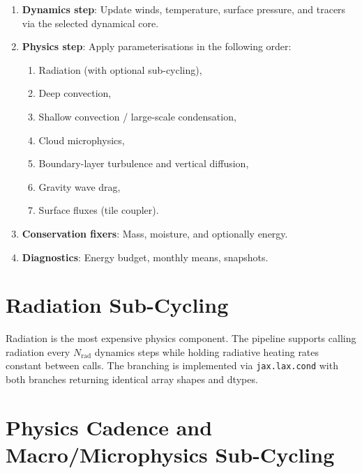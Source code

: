 \documentclass[11pt,twoside]{report}
\begin{document}
\begin{enumerate}[nosep]
  \item \textbf{Dynamics step}: Update winds, temperature, surface pressure,
    and tracers via the selected dynamical core.
  \item \textbf{Physics step}: Apply parameterisations in the following order:
    \begin{enumerate}[nosep]
      \item Radiation (with optional sub-cycling),
      \item Deep convection,
      \item Shallow convection / large-scale condensation,
      \item Cloud microphysics,
      \item Boundary-layer turbulence and vertical diffusion,
      \item Gravity wave drag,
      \item Surface fluxes (tile coupler).
    \end{enumerate}
  \item \textbf{Conservation fixers}: Mass, moisture, and optionally energy.
  \item \textbf{Diagnostics}: Energy budget, monthly means, snapshots.
\end{enumerate}

\section{Radiation Sub-Cycling}

Radiation is the most expensive physics component.  The pipeline supports
calling radiation every $N_{\mathrm{rad}}$ dynamics steps while holding
radiative heating rates constant between calls.  The branching is implemented
via \texttt{jax.lax.cond} with both branches returning identical array
shapes and dtypes.

\section{Physics Cadence and Macro/Microphysics Sub-Cycling}
\label{sec:physics-cadence}
\end{document}
